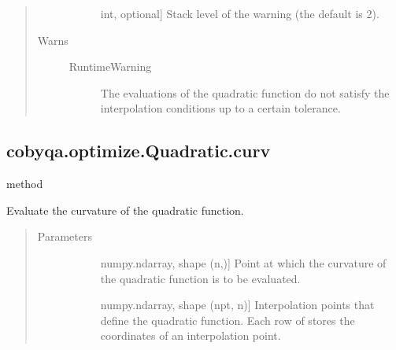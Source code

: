 \documentclass[letterpaper,10pt,english]{sphinxmanual}
\begin{document}
\begin{fulllineitems}
\begin{fulllineitems}
\begin{quote}
\begin{description}
\begin{description}
\item[{}] \leavevmode{[}int, optional{]}
\sphinxAtStartPar
Stack level of the warning (the default is 2).

\end{description}

\item[{Warns}] \leavevmode\begin{description}
\item[{RuntimeWarning}] \leavevmode
\sphinxAtStartPar
The evaluations of the quadratic function do not satisfy the
interpolation conditions up to a certain tolerance.

\end{description}

\end{description}\end{quote}

\end{fulllineitems}



\subsection{cobyqa.optimize.Quadratic.curv}
\label{\detokenize{refs/generated/cobyqa.optimize.Quadratic.curv:cobyqa-optimize-quadratic-curv}}\label{\detokenize{refs/generated/cobyqa.optimize.Quadratic.curv::doc}}
\sphinxAtStartPar
method

\begin{fulllineitems}
\label{\detokenize{refs/generated/cobyqa.optimize.Quadratic.curv:cobyqa.optimize.Quadratic.curv}}
\sphinxAtStartPar
Evaluate the curvature of the quadratic function.
\begin{quote}\begin{description}
\item[{Parameters}] \leavevmode\begin{description}
\item[{}] \leavevmode{[}numpy.ndarray, shape (n,){]}
\sphinxAtStartPar
Point at which the curvature of the quadratic function is to be
evaluated.

\item[{}] \leavevmode{[}numpy.ndarray, shape (npt, n){]}
\sphinxAtStartPar
Interpolation points that define the quadratic function. Each row of
 stores the coordinates of an interpolation point.


\end{description}
\end{description}
\end{quote}
\end{fulllineitems}
\end{fulllineitems}
\end{document}
